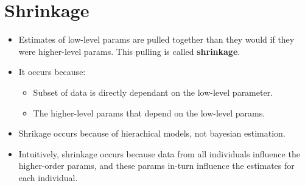 \documentclass{article}
\begin{document}
\section{Shrinkage}
\begin{itemize}
    \item Estimates of low-level params are pulled together than they would if they were higher-level params. This pulling is called \textbf{shrinkage}.
    \item It occurs because:
        \begin{itemize}
            \item Subset of data is directly dependant on the low-level parameter.
            \item The higher-level params that depend on the low-level params.
        \end{itemize}
    \item Shrikage occurs because of hierachical models, not bayesian estimation.
    \item Intuitively, shrinkage occurs because data from all individuals influence the higher-order params, and these params in-turn influence the estimates for each individual.
\end{itemize}
\end{document}
